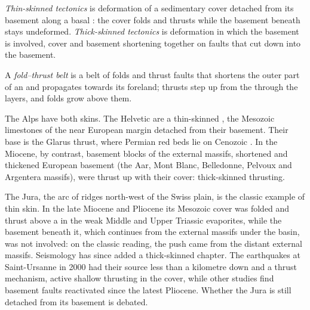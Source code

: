 \begin{definition}\label{def:b2:alpine-orogen:skin}
\emph{Thin-skinned tectonics} is deformation of a
sedimentary cover detached from its basement along a basal : the cover folds and
thrusts while the basement beneath stays undeformed. \emph{Thick-skinned
tectonics} is deformation in which the basement is involved,
cover and basement shortening together on faults that cut down into the basement.
\end{definition}

\begin{definition}\label{def:b2:alpine-orogen:ftb}
A \emph{fold--thrust belt} is a belt of folds and thrust faults
that shortens the outer part of an  and propagates towards its foreland; thrusts
step up from the  through the layers, and folds grow above them.
\end{definition}

The Alps have both skins. The Helvetic  are a thin-skinned , the
Mesozoic limestones of the near European margin detached from their basement. Their base is
the Glarus thrust, where Permian red beds lie on Cenozoic . In the Miocene, by
contrast, basement blocks of the external massifs, shortened and thickened European basement (the
Aar, Mont Blanc, Belledonne, Pelvoux and Argentera massifs), were thrust up with their
cover: thick-skinned thrusting.

The Jura, the arc of ridges north-west of the Swiss plain, is the classic example of thin
skin. In the late Miocene and Pliocene its Mesozoic cover was folded and thrust above a
 in the weak Middle and Upper Triassic evaporites, while the basement beneath
it, which continues from the external massifs under the  basin, was not involved: on
the classic reading, the push came from the distant external massifs. Seismology has since
added a thick-skinned chapter. The earthquakes at Saint-Ursanne in 2000 had their source
less than a kilometre down and a thrust mechanism, active shallow thrusting in the cover,
while other studies find basement faults reactivated since the latest Pliocene. Whether
the Jura is still detached from its basement is debated.

